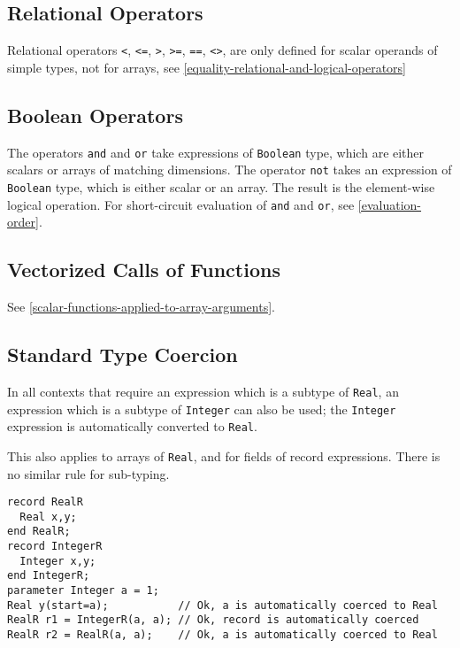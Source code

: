 \subsection{Relational Operators}\label{relational-operators}

Relational operators \lstinline!<!, \lstinline!<=!, \lstinline!>!,
\lstinline!>=!, \lstinline!==!, \lstinline!<>!, are only defined for
scalar operands of simple types, not for arrays, see \cref{equality-relational-and-logical-operators}

\subsection{Boolean Operators}\label{boolean-operators}

The operators \lstinline!and! and \lstinline!or! take expressions of \lstinline!Boolean! type, which are either scalars or arrays of matching dimensions.  The operator \lstinline!not!
takes an expression of \lstinline!Boolean! type, which is either scalar or an array.  The result is the element-wise logical operation.  For short-circuit evaluation of \lstinline!and!
and \lstinline!or!, see \cref{evaluation-order}.

\subsection{Vectorized Calls of Functions}\label{vectorized-calls-of-functions}

See \cref{scalar-functions-applied-to-array-arguments}.

\subsection{Standard Type Coercion}\label{standard-type-coercion}

In all contexts that require an expression which is a subtype of \lstinline!Real!, an expression which is a subtype of \lstinline!Integer! can also be used;
the \lstinline!Integer! expression is automatically converted to \lstinline!Real!.

This also applies to arrays of \lstinline!Real!, and for fields of record expressions.  There is no similar rule for sub-typing.

\begin{example}
\begin{lstlisting}[language=modelica]
record RealR
  Real x,y;
end RealR;
record IntegerR
  Integer x,y;
end IntegerR;
parameter Integer a = 1;
Real y(start=a);           // Ok, a is automatically coerced to Real
RealR r1 = IntegerR(a, a); // Ok, record is automatically coerced
RealR r2 = RealR(a, a);    // Ok, a is automatically coerced to Real
\end{lstlisting}
\end{example}

